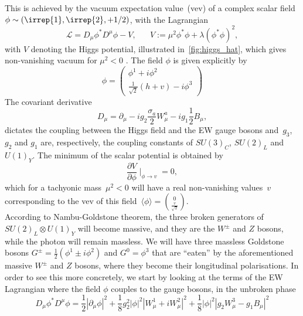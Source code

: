 This is  achieved by the vacuum expectation value~(vev) of a complex scalar field $\phi\sim (\irrep{1},\irrep{2},+1/2)$, with the Lagrangian 
\begin{equation}
    \mathcal{L} = D_\mu \phi^* D^\mu \phi -V,\;\;\;\;\;\; V:= \mu^2  \phi^* \phi +\lambda (\phi^* \phi)^2,
    \label{higgspot}
\end{equation}
 with $V$ denoting the Higgs potential, illustrated in~\autoref{fig:higgs_hat}, which gives non-vanishing vacuum for $ \mu^2 <0$ . The field $\phi$ is given explicitly by 
 \begin{equation}
  \phi = \begin{pmatrix}
      \phi^1 + i \phi^2\\  \frac{1}{\sqrt{2}}(h+v)-i \phi^3
  \end{pmatrix}
\end{equation}
The covariant derivative 
\begin{equation}
    D_\mu= \partial_\mu -ig_2\frac{\sigma_a}{2}W^a_\mu-ig_1\frac{1}{2} B_\mu,   
\end{equation}
dictates the coupling between the Higgs field and the EW gauge bosons and~$g_3$, $g_2$ and $g_1$ are, respectively, the coupling constants of 
${ SU(3)_C}$,  ${ SU(2)_L}$ and  ${ U(1)_Y}$.  
 The minimum of the scalar potential is obtained by
 \begin{equation}
\frac{\partial V}{\partial \phi} \mid_{\phi\to v} = 0,
\end{equation}
which for a tachyonic mass~$\mu^2 < 0$ will have a real non-vanishing values~$v$ corresponding to the vev of this field~$\langle \phi \rangle ={0\choose \frac{v}{\sqrt{2}}}$.\\
According to Nambu-Goldstone theorem, the three broken generators of~$SU(2)_L \otimes U(1)_Y$ will become massive, and they are the $W^\pm$ and $Z$ bosons, while the photon will remain massless. We will have three massless Goldstone bosons $ G^\pm=\frac{1}{2} (\phi^1\pm i\phi^2) $ and $G^0=\phi^3$ that are ``eaten'' by the aforementioned massive $W^\pm$ and $Z$ bosons, where they become their longitudinal polarisations. In order to see this more concretely, we start by looking at the terms of the EW Lagrangian where the field $\phi$ couples to the gauge bosons, in the unbroken phase
\begin{equation}
   D_\mu \phi^* D^\mu \phi = \frac{1}{2} |\partial_\mu \phi|^2 + \frac{1}{8}g_2^2|\phi|^2|W_\mu^1+iW_\mu^2|^2
   + \frac{1}{8}|\phi|^2 |g_2 W_\mu^3- g_1 B_\mu|^2
   \label{ewhiggs_ub}
\end{equation}

